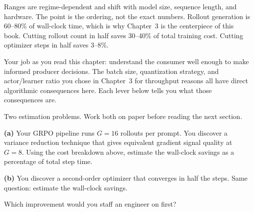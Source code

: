 \begin{center}
\end{center}

Ranges are regime-dependent and shift with model size, sequence length, and hardware. The point is the ordering, not the exact numbers. Rollout generation is 60--80\% of wall-clock time, which is why Chapter~3 is the centerpiece of this book. Cutting rollout count in half saves 30--40\% of total training cost. Cutting optimizer steps in half saves 3--8\%.

Your job as you read this chapter: understand the consumer well enough to make informed producer decisions. The batch size, quantization strategy, and actor/learner ratio you chose in Chapter~3 for throughput reasons all have direct algorithmic consequences here. Each lever below tells you what those consequences are.

\begin{thinkfirst}
Two estimation problems. Work both on paper before reading the next section.

\textbf{(a)} Your GRPO pipeline runs $G = 16$ rollouts per prompt. You discover a variance reduction technique that gives equivalent gradient signal quality at $G = 8$. Using the cost breakdown above, estimate the wall-clock savings as a percentage of total step time.

\textbf{(b)} You discover a second-order optimizer that converges in half the steps. Same question: estimate the wall-clock savings.

Which improvement would you staff an engineer on first?
\end{thinkfirst}


